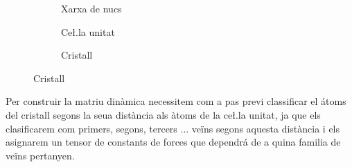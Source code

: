 \documentclass[12pt]{article} %
\begin{document}
\begin{figure}[h]
\centering
\begin{subfigure}[b]{0.3\textwidth}
\centering
{}
\caption{Xarxa de nucs}
\end{subfigure}
\begin{subfigure}[b]{0.3\textwidth}
\centering
{}
\caption{Ce\l.la unitat}
\end{subfigure}
\begin{subfigure}[b]{0.3\textwidth}
\centering
{}
\caption{Cristall}
\end{subfigure}
\end{figure}

Per construir la matriu dinàmica necessitem com a pas previ classificar el átoms del cristall segons la seua distància als àtoms de la ce\l.la unitat, ja que els clasificarem com primers, segons, tercers ... veïns segons aquesta distància i els asignarem un tensor de constants de forces que dependrá de a quina familia de veïns pertanyen. 
\end{document}
